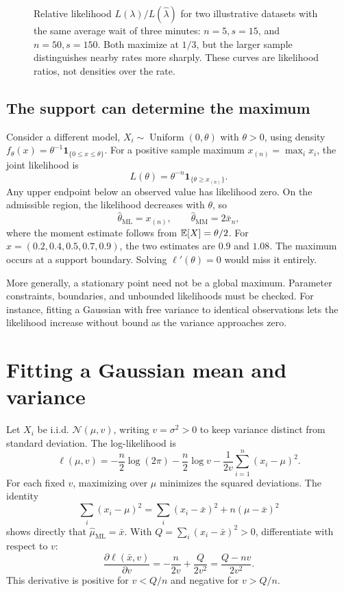 \begin{figure}[H]
  \centering\EstLikelihoodPlot
  \caption{Relative likelihood \(L(\lambda)/L(\widehat\lambda)\) for two
  illustrative datasets with the same average wait of three minutes:
  \(n=5,s=15\), and \(n=50,s=150\). Both maximize at \(1/3\), but the
  larger sample distinguishes nearby rates more sharply. These curves are
  likelihood ratios, not densities over the rate.}
  \label{fig:est-likelihood}
\end{figure}

\subsection{The support can determine the maximum}

Consider a different model, \(X_i\sim\operatorname{Uniform}(0,\theta)\)
with \(\theta>0\), using density
\(f_\theta(x)=\theta^{-1}\mathbf1_{\{0\le x\le\theta\}}\).
For a positive sample maximum \(x_{(n)}=\max_i x_i\), the joint likelihood is
\[
  L(\theta)=\theta^{-n}\mathbf1_{\{\theta\ge x_{(n)}\}}.
\]
Any upper endpoint below an observed value has likelihood zero. On the
admissible region, the likelihood decreases with \(\theta\), so
\[
  \widehat\theta_{\mathrm{ML}}=x_{(n)},\qquad
  \widehat\theta_{\mathrm{MM}}=2\bar x_n,
\]
where the moment estimate follows from \(\mathbb{E}[X]=\theta/2\).
For \(x=(0.2,0.4,0.5,0.7,0.9)\), the two estimates are \(0.9\) and
\(1.08\). The maximum occurs at a support boundary. Solving
\(\ell'(\theta)=0\) would miss it entirely.

More generally, a stationary point need not be a global maximum. Parameter
constraints, boundaries, and unbounded likelihoods must be checked. For
instance, fitting a Gaussian with free variance to identical observations
lets the likelihood increase without bound as the variance approaches zero.

\section{Fitting a Gaussian mean and variance}
\label{sec:gaussian-estimation}

Let \(X_i\) be i.i.d. \(\mathcal N(\mu,v)\), writing \(v=\sigma^2>0\)
to keep variance distinct from standard deviation. The log-likelihood is
\[
  \ell(\mu,v)=-\frac n2\log(2\pi)-\frac n2\log v
              -\frac1{2v}\sum_{i=1}^n(x_i-\mu)^2.
\]
For each fixed \(v\), maximizing over \(\mu\) minimizes the squared
deviations. The identity
\[
  \sum_i(x_i-\mu)^2=\sum_i(x_i-\bar x)^2+n(\mu-\bar x)^2
\]
shows directly that \(\widehat\mu_{\mathrm{ML}}=\bar x\). With
\(Q=\sum_i(x_i-\bar x)^2>0\), differentiate with respect to \(v\):
\[
  \frac{\partial\ell(\bar x,v)}{\partial v}
  =-\frac n{2v}+\frac Q{2v^2}
  =\frac{Q-nv}{2v^2}.
\]
This derivative is positive for \(v<Q/n\) and negative for \(v>Q/n\).

